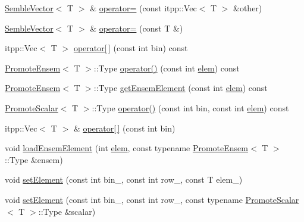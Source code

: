 \begin{DoxyCompactItemize}
\item 
\mbox{\hyperlink{structSEMBLE_1_1SembleVector}{Semble\+Vector}}$<$ T $>$ \& \mbox{\hyperlink{structSEMBLE_1_1SembleVector_a840cf4b02e399eb2987a52e3dec3aa34}{operator=}} (const itpp\+::\+Vec$<$ T $>$ \&other)
\item 
\mbox{\hyperlink{structSEMBLE_1_1SembleVector}{Semble\+Vector}}$<$ T $>$ \& \mbox{\hyperlink{structSEMBLE_1_1SembleVector_ae6619b807d24f5a50ca059bc8a95cc0b}{operator=}} (const T \&)
\item 
itpp\+::\+Vec$<$ T $>$ \mbox{\hyperlink{structSEMBLE_1_1SembleVector_a4414339e2adc695429190b1cdda57463}{operator\mbox{[}$\,$\mbox{]}}} (const int bin) const
\item 
\mbox{\hyperlink{structSEMBLE_1_1PromoteEnsem}{Promote\+Ensem}}$<$ T $>$\+::Type \mbox{\hyperlink{structSEMBLE_1_1SembleVector_adc79020ae59d85061589bf64e27bf5be}{operator()}} (const int \mbox{\hyperlink{structSEMBLE_1_1SembleVector_a4054d66d607dbedd52f2d11cd9d1086c}{elem}}) const
\item 
\mbox{\hyperlink{structSEMBLE_1_1PromoteEnsem}{Promote\+Ensem}}$<$ T $>$\+::Type \mbox{\hyperlink{structSEMBLE_1_1SembleVector_a70c2aeeff708443ca03f03a8b765d84d}{get\+Ensem\+Element}} (const int \mbox{\hyperlink{structSEMBLE_1_1SembleVector_a4054d66d607dbedd52f2d11cd9d1086c}{elem}}) const
\item 
\mbox{\hyperlink{structSEMBLE_1_1PromoteScalar}{Promote\+Scalar}}$<$ T $>$\+::Type \mbox{\hyperlink{structSEMBLE_1_1SembleVector_af05406732af89745b53fa34cf7cb7580}{operator()}} (const int bin, const int \mbox{\hyperlink{structSEMBLE_1_1SembleVector_a4054d66d607dbedd52f2d11cd9d1086c}{elem}}) const
\item 
itpp\+::\+Vec$<$ T $>$ \& \mbox{\hyperlink{structSEMBLE_1_1SembleVector_a598a63740ec24f8ef6972aed167adcf2}{operator\mbox{[}$\,$\mbox{]}}} (const int bin)
\item 
void \mbox{\hyperlink{structSEMBLE_1_1SembleVector_acac507fe462d0c438a429128dfbf0eb1}{load\+Ensem\+Element}} (int \mbox{\hyperlink{structSEMBLE_1_1SembleVector_a4054d66d607dbedd52f2d11cd9d1086c}{elem}}, const typename \mbox{\hyperlink{structSEMBLE_1_1PromoteEnsem}{Promote\+Ensem}}$<$ T $>$\+::Type \&ensem)
\item 
void \mbox{\hyperlink{structSEMBLE_1_1SembleVector_ac0fe91a94d59588d817fb4e0f13fcc65}{set\+Element}} (const int bin\+\_\+, const int row\+\_\+, const T elem\+\_\+)
\item 
void \mbox{\hyperlink{structSEMBLE_1_1SembleVector_a0eeec0b9e7992933a309dde7b0d92b05}{set\+Element}} (const int bin\+\_\+, const int row\+\_\+, const typename \mbox{\hyperlink{structSEMBLE_1_1PromoteScalar}{Promote\+Scalar}}$<$ T $>$\+::Type \&scalar)

\end{DoxyCompactItemize}
